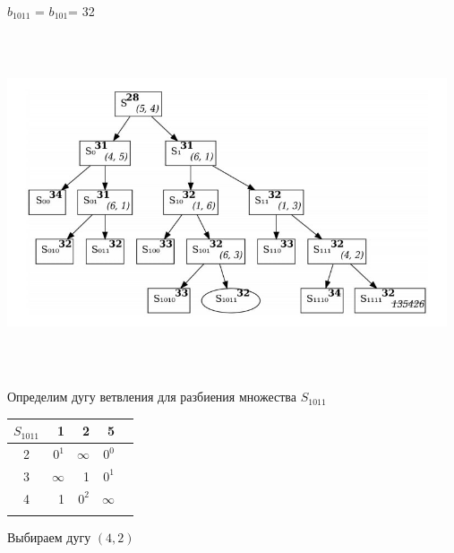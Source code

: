 \documentclass[12pt]{article}
\begin{document}
$b_{1011}$ = $b_{101}$= 32\\
\begin{flushleft}
 
\includegraphics[width = 13cm, height = 10cm]{pictures/picture_07.jpg}\\
\end{flushleft}
\vspace{3cm}
\begin{flushleft}
 
Определим дугу ветвления для разбиения множества $S_{1011}$\\
\end{flushleft}

\begin{flushleft}
\begin{tabular}{c||rrr||c}
$S_{1011}$ & 1 & 2  & 5 &  \\
\hline
\hline
2 & $0^1$ & $\infty$   & $0^0$ &  \\
3 & $\infty$ & 1   & $0^1$ &  \\
4 & 1 & $0^2$   & $\infty$ &  \\
\hline
\hline
 &  &  &  &  & \\
\end{tabular}
\end{flushleft}

Выбираем дугу $(4,2)$
\end{document}

